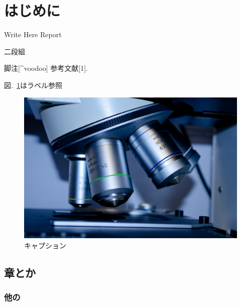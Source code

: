 \documentclass[10pt,a4paper,twocolumn]{jarticle}
\begin{document}
    \twocolumn[
    \begin{@twocolumnfalse}
      \maketitle
      \begin{abstract}
        
      \end{abstract}
    \end{@twocolumnfalse}
  ]

  \hypertarget{ux306fux3058ux3081ux306b}{%
  \section{はじめに}\label{ux306fux3058ux3081ux306b}}
  
  Write Here Report
  
  二段組
  
  脚注{[}\^{}voodoo{]} 参考文献{[}1{]}.
  
  図.~\ref{fig:img}はラベル参照
  
  \begin{figure}
  \hypertarget{fig:img}{%
  \centering
  \includegraphics{img/img.jpg}
  \caption{キャプション}\label{fig:img}
  }
  \end{figure}
  
  \hypertarget{ux7ae0ux3068ux304b}{%
  \subsection{章とか}\label{ux7ae0ux3068ux304b}}
  
  \hypertarget{ux4ed6ux306e}{%
  \subsubsection{他の}\label{ux4ed6ux306e}}
  
\end{document}
